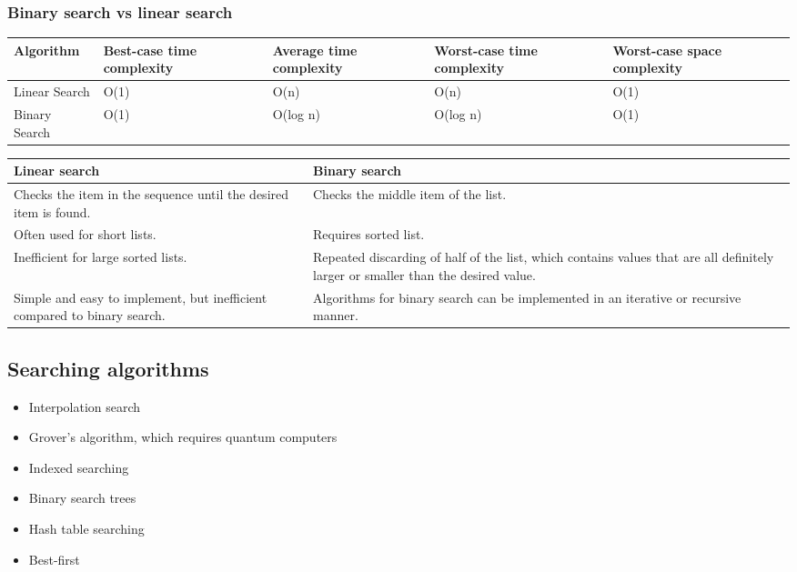 \documentclass[11pt]{article}
\begin{document}
 \newpage

\subsubsection{Binary search vs linear search}
\label{sec:orgb1a2c7f}
\begin{center}
\begin{tabular}{|m{6.5em}|m{5em}|m{7em}|m{6em}|m{6em}|}
\hline
\textbf{Algorithm} & \textbf{Best-case time complexity} & \textbf{Average time complexity} & \textbf{Worst-case time complexity} & \textbf{Worst-case space complexity}\\[0pt]
\hline
Linear Search & O(1) & O(n) & O(n) & O(1)\\[0pt]
Binary Search & O(1) & O(log n) & O(log n) & O(1)\\[0pt]
\hline
\end{tabular}
\end{center}

\begin{center}
\begin{tabular}{|m{17em}|m{17em}|}
\hline
\textbf{Linear search} & \textbf{Binary search}\\[0pt]
\hline
Checks the item in the sequence until the desired item is found. & Checks the middle item of the list.\\[0pt]
\hline
Often used for short lists. & Requires sorted list.\\[0pt]
\hline
Inefficient for large sorted lists. & Repeated discarding of half of the list, which contains values that are all definitely larger or smaller than the desired value.\\[0pt]
\hline
Simple and easy to implement, but inefficient compared to binary search. & Algorithms for binary search can be implemented in an iterative or recursive manner.\\[0pt]
\hline
\end{tabular}
\end{center}

\subsection{Searching algorithms}
\label{sec:org8c2c371}
\begin{itemize}
\item Interpolation search
\item Grover's algorithm, which requires quantum computers
\item Indexed searching
\item Binary search trees
\item Hash table searching
\item Best-first
\end{itemize}
\end{document}
